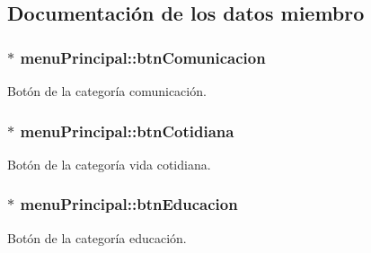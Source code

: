 \subsection{Documentación de los datos miembro}
\hypertarget{classmenu_principal_a731ca834c77af1bade609b3bc28ab02c}{}
\subsubsection[{btn\+Comunicacion}]{$\ast$ menu\+Principal\+::btn\+Comunicacion\hspace{0.3cm}{\ttfamily [private]}}\label{classmenu_principal_a731ca834c77af1bade609b3bc28ab02c}


Botón de la categoría comunicación. 

\hypertarget{classmenu_principal_a9c27d54b3333900acd941d889019ba1a}{}
\subsubsection[{btn\+Cotidiana}]{$\ast$ menu\+Principal\+::btn\+Cotidiana\hspace{0.3cm}{\ttfamily [private]}}\label{classmenu_principal_a9c27d54b3333900acd941d889019ba1a}


Botón de la categoría vida cotidiana. 

\hypertarget{classmenu_principal_ab26a999803f322e9c9f05acd53125a8c}{}
\subsubsection[{btn\+Educacion}]{$\ast$ menu\+Principal\+::btn\+Educacion\hspace{0.3cm}{\ttfamily [private]}}\label{classmenu_principal_ab26a999803f322e9c9f05acd53125a8c}


Botón de la categoría educación. 

\hypertarget{classmenu_principal_aea487ca8d9e0d1df2fda6a563ca0f04c}{}
